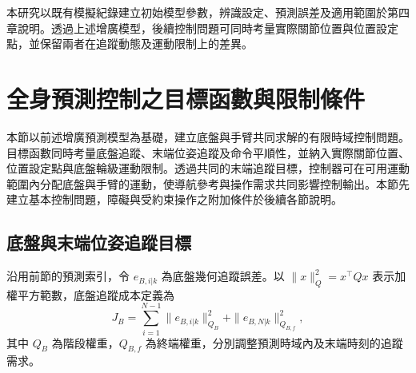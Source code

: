 本研究以既有模擬紀錄建立初始模型參數，辨識設定、預測誤差及適用範圍於第四章說明。透過上述增廣模型，後續控制問題可同時考量實際關節位置與位置設定點，並保留兩者在追蹤動態及運動限制上的差異。



\section{全身預測控制之目標函數與限制條件}
\label{sec:wholebody_objective_constraints}

本節以前述增廣預測模型為基礎，建立底盤與手臂共同求解的有限時域控制問題。目標函數同時考量底盤追蹤、末端位姿追蹤及命令平順性，並納入實際關節位置、位置設定點與底盤輪級運動限制。透過共同的末端追蹤目標，控制器可在可用運動範圍內分配底盤與手臂的運動，使導航參考與操作需求共同影響控制輸出。本節先建立基本控制問題，障礙與受約束操作之附加條件於後續各節說明。

\subsection{底盤與末端位姿追蹤目標}
\label{subsec:wholebody_tracking_objective}

沿用前節的預測索引，令 $e_{B,i|k}$ 為底盤幾何追蹤誤差。以 $\|x\|_Q^2=x^{\top}Qx$ 表示加權平方範數，底盤追蹤成本定義為
\begin{equation}
    J_B=
    \sum_{i=1}^{N-1}\|e_{B,i|k}\|_{Q_B}^{2}
    +\|e_{B,N|k}\|_{Q_{B,f}}^{2},
    \label{eq:ch3_base_tracking_cost}
\end{equation}
其中 $Q_B$ 為階段權重，$Q_{B,f}$ 為終端權重，分別調整預測時域內及末端時刻的追蹤需求。

